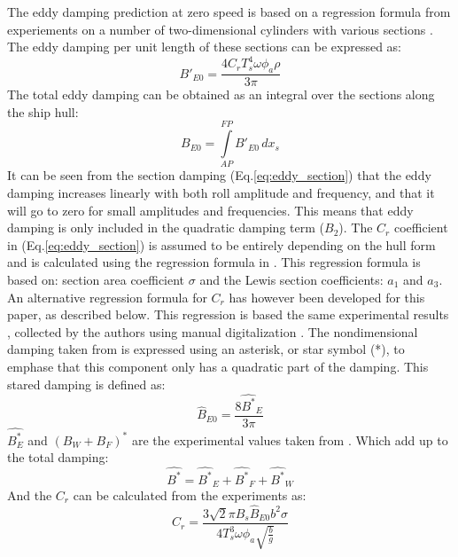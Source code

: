 The eddy damping prediction at zero speed is based on a regression
formula from experiements on a number of two-dimensional cylinders with
various sections \citep{7505983/4AFVVGNT}. The eddy damping per unit
length of these sections can be expressed as:
\begin{equation}
B'_{E0} = \frac{4 C_{r} T_{s}^{4} \omega \phi_{a} \rho}{3 \pi}
\label{eq:eddy_section}
\end{equation}
The total eddy damping can be obtained as an integral over the sections
along the ship hull:
\begin{equation}
B_{E0} = \int\limits_{AP}^{FP} B'_{E0}\, dx_{s}
\label{eq:eddy_integration}
\end{equation}
It can be seen from the section damping
(Eq.\ref{eq:eddy_section}) that the eddy damping increases
linearly with both roll amplitude and frequency, and that it will go to
zero for small amplitudes and frequencies. This means that eddy damping
is only included in the quadratic damping term ($B_2$). The $C_r$
coefficient in (Eq.\ref{eq:eddy_section}) is assumed to be
entirely depending on the hull form and is calculated using the
regression formula in \citep{7505983/4AFVVGNT}. This regression formula
is based on: section area coefficient $\sigma$ and the Lewis section
coefficients: $a_1$ and $a_3$. An alternative regression formula for
$C_r$ has however been developed for this paper, as described below.
This regression is based the same experimental results
\citep{7505983/4AFVVGNT}, collected by the authors using manual
digitalization \citep{7505983/8YUE24LM}.
The nondimensional damping taken from \citep{7505983/4AFVVGNT} is
expressed using an asterisk, or star symbol (*), to emphase that this
component only has a quadratic part of the damping. This stared damping
is defined as:
\begin{equation}
\hat{B}_{E0} = \frac{8 \hat{B^*}_{E}}{3 \pi}
\label{eq:B_E_star_hat}
\end{equation}
$\hat{B_E^*}$ and $(B_W+B_F)^*$ are the experimental values taken
from \citep{7505983/4AFVVGNT}. Which add up to the total damping:
\begin{equation}
\hat{B^*} = \hat{B^*}_{E} + \hat{B^*}_{F} + \hat{B^*}_{W}
\label{eq:B_star_hat}
\end{equation}
And the $C_r$ can be calculated from the experiments as:
\begin{equation}
C_{r} = \frac{3 \sqrt{2} \pi B_{s} \hat{B}_{E0} b^{2} \sigma}{4 T_{s}^{3} \omega \phi_{a} \sqrt{\frac{b}{g}}}
\label{eq:C_r_2}
\end{equation}

